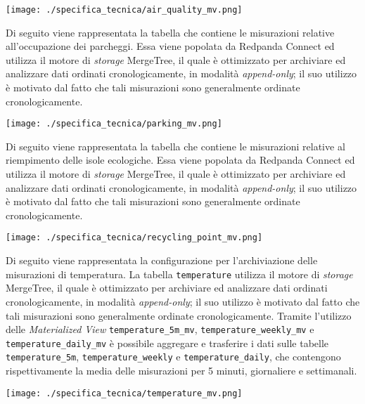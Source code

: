 \begin{center}
	\texttt{[image: ./specifica\_tecnica/air\_quality\_mv.png]}
\end{center}
Di seguito viene rappresentata la tabella che contiene le misurazioni relative all'occupazione dei parcheggi. Essa viene popolata da Redpanda Connect ed utilizza il motore di \textit{storage}
MergeTree, il quale è ottimizzato per archiviare ed analizzare dati ordinati cronologicamente, in modalità \textit{append-only}; il suo
utilizzo è motivato dal fatto che tali misurazioni sono generalmente ordinate cronologicamente.
\begin{center}
	\texttt{[image: ./specifica\_tecnica/parking\_mv.png]}
\end{center}
Di seguito viene rappresentata la tabella che contiene le misurazioni relative al riempimento delle isole ecologiche. Essa viene popolata da Redpanda Connect ed utilizza il motore di \textit{storage}
MergeTree, il quale è ottimizzato per archiviare ed analizzare dati ordinati cronologicamente, in modalità \textit{append-only}; il suo
utilizzo è motivato dal fatto che tali misurazioni sono generalmente ordinate cronologicamente.
\begin{center}
	\texttt{[image: ./specifica\_tecnica/recycling\_point\_mv.png]}
\end{center}
Di seguito viene rappresentata la configurazione per l'archiviazione delle misurazioni di temperatura. La tabella \texttt{temperature} utilizza il motore di \textit{storage}
MergeTree, il quale è ottimizzato per archiviare ed analizzare dati ordinati cronologicamente, in modalità \textit{append-only}; il suo
utilizzo è motivato dal fatto che tali misurazioni sono generalmente ordinate cronologicamente.
Tramite l'utilizzo delle \textit{Materialized View} \texttt{temperature\_5m\_mv}, \texttt{temperature\_weekly\_mv} e \texttt{temperature\_daily\_mv}
è possibile aggregare e trasferire i dati sulle tabelle \texttt{temperature\_5m}, \texttt{temperature\_weekly} e \texttt{temperature\_daily},
che contengono rispettivamente la media delle misurazioni per 5 minuti, giornaliere e settimanali.
\begin{center}
	\texttt{[image: ./specifica\_tecnica/temperature\_mv.png]}
\end{center}

